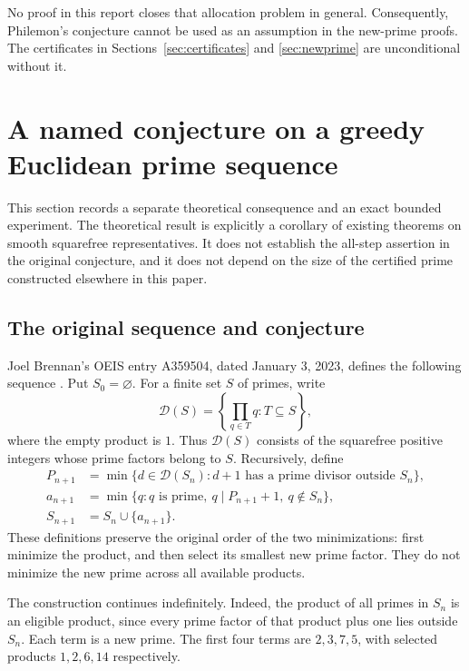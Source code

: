\documentclass[11pt,a4paper]{article}
\theoremstyle{definition}\newtheorem{definition}[theorem]{Definition}
\theoremstyle{remark}\newtheorem{remark}[theorem]{Remark}
\begin{document}
No proof in this report closes that allocation problem in general.
Consequently, Philemon's conjecture cannot be used as an assumption in
the new-prime proofs. The certificates in Sections~\ref{sec:certificates}
and \ref{sec:newprime} are unconditional without it.

\section{A named conjecture on a greedy Euclidean prime sequence}
\label{sec:brennan}

This section records a separate theoretical consequence and an exact bounded
experiment.  The theoretical result is explicitly a corollary of existing
theorems on smooth squarefree representatives.  It does not establish the
all-step assertion in the original conjecture, and it does not depend on the
size of the certified prime constructed elsewhere in this paper.

\subsection{The original sequence and conjecture}

Joel Brennan's OEIS entry A359504, dated January 3, 2023, defines the following
sequence \cite{oeis359504}.  Put $S_0=\varnothing$.  For a finite set $S$ of
primes, write
\[
  \mathcal D(S)=\left\{\prod_{q\in T}q:T\subseteq S\right\},
\]
where the empty product is $1$.  Thus $\mathcal D(S)$ consists of the
squarefree positive integers whose prime factors belong to $S$.  Recursively,
define
\begin{align*}
 P_{n+1}&=\min\{d\in\mathcal D(S_n):
       d+1\text{ has a prime divisor outside }S_n\},\\
 a_{n+1}&=\min\{q:q\text{ is prime},\ q\mid P_{n+1}+1,\ q\notin S_n\},\\
 S_{n+1}&=S_n\cup\{a_{n+1}\}.
\end{align*}
These definitions preserve the original order of the two minimizations:
first minimize the product, and then select its smallest new prime factor.
They do not minimize the new prime across all available products.

The construction continues indefinitely.  Indeed, the product of all primes
in $S_n$ is an eligible product, since every prime factor of that product
plus one lies outside $S_n$.  Each term is a new prime.  The first four terms
are $2,3,7,5$, with selected products $1,2,6,14$ respectively.
\end{document}
